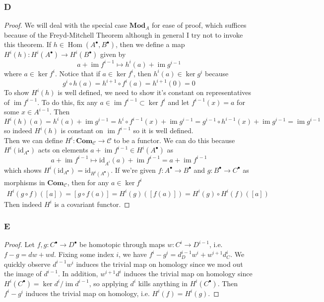\documentclass{article}
\newcommand{\id}{\mathrm{id}}
\newcommand{\fC}{\mathscr{C}}
\DeclareMathOperator{\im}{im}
\DeclareMathOperator{\Hom}{Hom}
\newcommand{\Mod}{\mathbf{Mod}} %
\newcommand{\Com}{\mathbf{Com}} %
\begin{document}
\subsubsection{D}\label{1.6.D}
\begin{proof}
    We will deal with the special case $\Mod_A$ for ease of proof, which suffices because of the Freyd-Mitchell Theorem although in general I try not to invoke this theorem. If $h\in \Hom(A^\bullet, B^\bullet)$, then we define a map $H^i(h):H^i(A^\bullet)\to H^i(B^\bullet)$ given by
    \[
    a+\im f^{i-1}\mapsto h^i(a) +\im g^{i-1}
    \]
    where $a\in \ker f^i$. Notice that if $a\in \ker f^i$, then $h^i(a)\in \ker g^i$ because 
    \[
    g^i\circ h(a)=h^{i+1}\circ f^i(a)=h^{i+1}(0)=0
    \]
    To show $H^i(h)$ is well defined, we need to show it's constant on representatives of $\im f^{i-1}$. To do this, fix any $a\in \im f^{i-1}\subset \ker f^{i}$ and let $f^{i-1}(x)=a$ for some $x\in A^{i-1}$. Then
    \[
    H^i(h)(a)=h^i(a)+\im g^{i-1}=h^i\circ f^{i-1}(x)+\im g^{i-1}=g^{i-1}\circ h^{i-1}(x)+\im g^{i-1}=\im g^{i-1}
    \]
    so indeed $H^i(h)$ is constant on $\im f^{i-1}$ so it is well defined.\\
    Then we can define $H^i:\Com_\fC \to \fC$ to be a functor. We can do this because $H^i(\id_{A^\bullet})$ acts on elements $a+\im f^{i-1}\in H^i(A^\bullet)$ as
    \[
    a+\im f^{i-1}\mapsto \id_{A^i}(a)+\im f^{i-1}=a+\im f^{i-1}
    \]
    which shows $H^i(\id_{A^\bullet})=\id_{H^i(A^\bullet)}$. If we're given $f:A^\bullet\to B^\bullet$ and $g:B^\bullet\to C^\bullet$ as morphisms in $\Com_\fC$, then for any $a\in \ker f^i$
    \begin{align*}
        H^i(g\circ f)([a])=[g\circ f(a)]=H^i(g)([f(a)])=H^i(g)\circ H^i(f)([a])
    \end{align*}
    Then indeed $H^i$ is a covariant functor.
\end{proof}
\subsubsection{E}\label{1.6.E}
\begin{proof}
    Let $f,g:C^\bullet \to D^\bullet$ be homotopic through maps $w:C^i\to D^{i-1}$, i.e. $f-g = dw+wd$. Fixing some index $i$, we have $f^i-g^i =d_D^{i-1} w^i + w^{i+1} d_C^i$. We quickly observe $d^{i-1} w^i$ induces the trivial map on homology since we mod out the image of $d^{i-1}$. In addition, $w^{i+1} d^i$ induces the trivial map on homology since $H^i(C^\bullet) = \ker d^i/\im d^{i-1}$, so applying $d^i$ kills anything in $H^i(C^\bullet)$. Then $f^i-g^i$ induces the trivial map on homology, i.e. $H^i(f) = H^i(g)$.
\end{proof}
\end{document}
